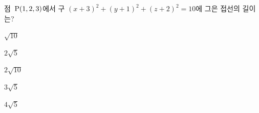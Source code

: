 점~$\mathrm{P}(1{,}\mkern3mu\mathopen{}2{,}\mkern3mu\mathopen{}3)$에서 구 $(x+3)^2+(y+1)^2+(z+2)^2=10$에 그은 접선의 길이는?
\begin{choices32}{\rule[-3ex]{0pt}{8ex}$\sqrt{10}$}{\rule[-3ex]{0pt}{8ex}$2\sqrt{5}$}{\rule[-3ex]{0pt}{8ex}$2\sqrt{10}$}{\rule[-3ex]{0pt}{8ex}$3\sqrt{5}$}{\rule[-3ex]{0pt}{8ex}$4\sqrt{5}$}\end{choices32}

